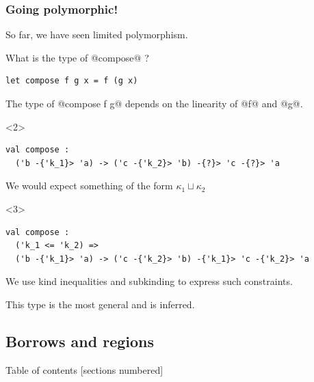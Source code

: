 \documentclass[aspectratio=169,dvipsnames,svgnames,10pt]{beamer}
\begin{document}
\begin{frame}[t,fragile]
  \frametitle{Going polymorphic!}

  
  So far, we have seen limited polymorphism.

  What is the type of @compose@ ?

\begin{verbatim}
let compose f g x = f (g x)
\end{verbatim}

  The type of @compose f g@ depends on the linearity of @f@ and @g@.
\begin{onlyenv}<2>
\begin{lstlisting}
val compose :
  ('b -{'k_1}> 'a) -> ('c -{'k_2}> 'b) -{?}> 'c -{?}> 'a
\end{lstlisting}\pause

We would expect something of the form $\kappa_1 \sqcup \kappa_2$
\end{onlyenv}

\begin{onlyenv}<3>
\begin{lstlisting}
val compose :
  ('k_1 <= 'k_2) =>
  ('b -{'k_1}> 'a) -> ('c -{'k_2}> 'b) -{'k_1}> 'c -{'k_2}> 'a
\end{lstlisting}

We use kind inequalities and subkinding to express such constraints.

This type is the most general and is inferred.
\end{onlyenv}
  
\end{frame}

\subsection{Borrows and regions}

\begin{frame}{Table of contents}
  [sections numbered]
\end{frame}
\end{document}
